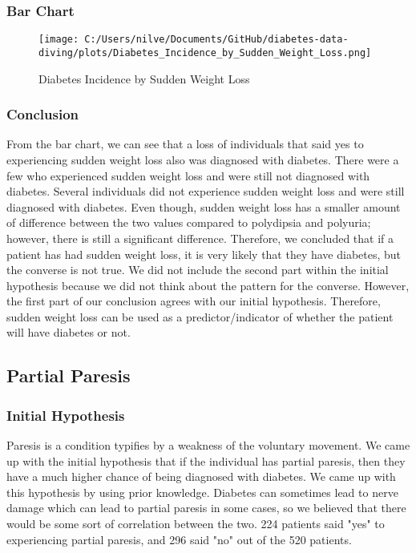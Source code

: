 \documentclass[
]{article}
\begin{document}
\hypertarget{header-n895}{%
\subsubsection{Bar Chart}\label{header-n895}}

\begin{figure}
\centering
\texttt{[image: C:/Users/nilve/Documents/GitHub/diabetes-data-diving/plots/Diabetes\_Incidence\_by\_Sudden\_Weight\_Loss.png]}
\caption{Diabetes Incidence by Sudden Weight Loss}
\end{figure}

\hypertarget{header-n897}{%
\subsubsection{Conclusion}\label{header-n897}}

From the bar chart, we can see that a loss of individuals that said yes
to experiencing sudden weight loss also was diagnosed with diabetes.
There were a few who experienced sudden weight loss and were still not
diagnosed with diabetes. Several individuals did not experience sudden
weight loss and were still diagnosed with diabetes. Even though, sudden
weight loss has a smaller amount of difference between the two values
compared to polydipsia and polyuria; however, there is still a
significant difference. Therefore, we concluded that if a patient has
had sudden weight loss, it is very likely that they have diabetes, but
the converse is not true. We did not include the second part within the
initial hypothesis because we did not think about the pattern for the
converse. However, the first part of our conclusion agrees with our
initial hypothesis. Therefore, sudden weight loss can be used as a
predictor/indicator of whether the patient will have diabetes or not.

\hypertarget{header-n899}{%
\subsection{Partial Paresis}\label{header-n899}}

\hypertarget{header-n900}{%
\subsubsection{Initial Hypothesis}\label{header-n900}}

Paresis is a condition typifies by a weakness of the voluntary movement.
We came up with the initial hypothesis that if the individual has
partial paresis, then they have a much higher chance of being diagnosed
with diabetes. We came up with this hypothesis by using prior knowledge.
Diabetes can sometimes lead to nerve damage which can lead to partial
paresis in some cases, so we believed that there would be some sort of
correlation between the two. 224 patients said "yes" to experiencing
partial paresis, and 296 said "no" out of the 520 patients.
\end{document}
